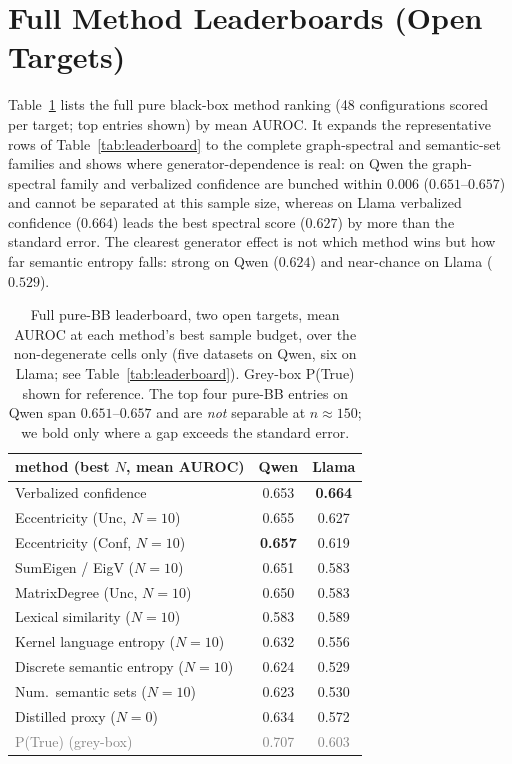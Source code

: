 \documentclass[11pt]{article}
\newcommand{\best}[1]{\textbf{#1}}
\newcommand{\grey}[1]{\textcolor{gray}{#1}}
\begin{document}
\section{Full Method Leaderboards (Open Targets)}\label{app:leaderboard}
Table~\ref{tab:app-open} lists the full pure black-box method ranking (48 configurations
scored per target; top entries shown) by mean AUROC. It expands the representative rows of
Table~\ref{tab:leaderboard} to the complete graph-spectral and semantic-set families and
shows where generator-dependence is real: on Qwen the graph-spectral family and verbalized
confidence are bunched within $0.006$ ($0.651$--$0.657$) and cannot be separated at this sample
size, whereas on Llama verbalized confidence ($0.664$) leads the best spectral score ($0.627$)
by more than the standard error. The clearest generator effect is not which method wins but how
far semantic entropy falls: strong on Qwen ($0.624$) and near-chance on Llama ($0.529$).

\begin{table}[t]\centering\small
\setlength{\tabcolsep}{5pt}
\begin{tabular}{l cc}
\toprule
method (best $N$, mean AUROC) & Qwen & Llama\\
\midrule
Verbalized confidence         & 0.653 & \best{0.664}\\
Eccentricity (Unc, $N{=}10$)  & 0.655 & 0.627\\
Eccentricity (Conf, $N{=}10$) & \best{0.657} & 0.619\\
SumEigen / EigV ($N{=}10$)    & 0.651 & 0.583\\
MatrixDegree (Unc, $N{=}10$)  & 0.650 & 0.583\\
Lexical similarity ($N{=}10$) & 0.583 & 0.589\\
Kernel language entropy ($N{=}10$) & 0.632 & 0.556\\
Discrete semantic entropy ($N{=}10$) & 0.624 & 0.529\\
Num.\ semantic sets ($N{=}10$)& 0.623 & 0.530\\
Distilled proxy ($N{=}0$)     & 0.634 & 0.572\\
\grey{P(True) (grey-box)}     & \grey{0.707} & \grey{0.603}\\
\bottomrule
\end{tabular}
\caption{Full pure-BB leaderboard, two open targets, mean AUROC at each method's best
sample budget, over the non-degenerate cells only (five datasets on Qwen, six on Llama; see
Table~\ref{tab:leaderboard}). Grey-box P(True) shown for reference. The top four pure-BB
entries on Qwen span $0.651$--$0.657$ and are \emph{not} separable at $n{\approx}150$; we bold
only where a gap exceeds the standard error.}
\label{tab:app-open}
\end{table}
\end{document}
